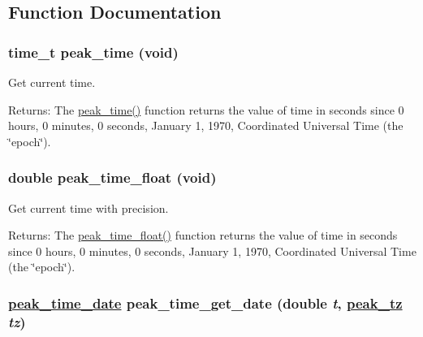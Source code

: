 \subsection{Function Documentation}
\hypertarget{group__time_ga0}{
\subsubsection[peak\_\-time]{\setlength{\rightskip}{0pt plus 5cm}time\_\-t peak\_\-time (void)}}
\label{group__time_ga0}


Get current time. 

\begin{Desc}
\item[Returns:]The \hyperlink{group__time_ga6}{peak\_\-time()} function returns the value of time in seconds since 0 hours, 0 minutes, 0 seconds, January 1, 1970, Coordinated Universal Time (the \char`\"{}epoch\char`\"{}). \end{Desc}
\hypertarget{group__time_ga1}{
\subsubsection[peak\_\-time\_\-float]{\setlength{\rightskip}{0pt plus 5cm}double peak\_\-time\_\-float (void)}}
\label{group__time_ga1}


Get current time with precision. 

\begin{Desc}
\item[Returns:]The \hyperlink{group__time_ga7}{peak\_\-time\_\-float()} function returns the value of time in seconds since 0 hours, 0 minutes, 0 seconds, January 1, 1970, Coordinated Universal Time (the \char`\"{}epoch\char`\"{}). \end{Desc}
\hypertarget{group__time_ga2}{
\subsubsection[peak\_\-time\_\-get\_\-date]{\setlength{\rightskip}{0pt plus 5cm}\hyperlink{structpeak__time__date}{peak\_\-time\_\-date} peak\_\-time\_\-get\_\-date (double {\em t}, \hyperlink{group__tz_ga0}{peak\_\-tz} {\em tz})}}
\label{group__time_ga2}


